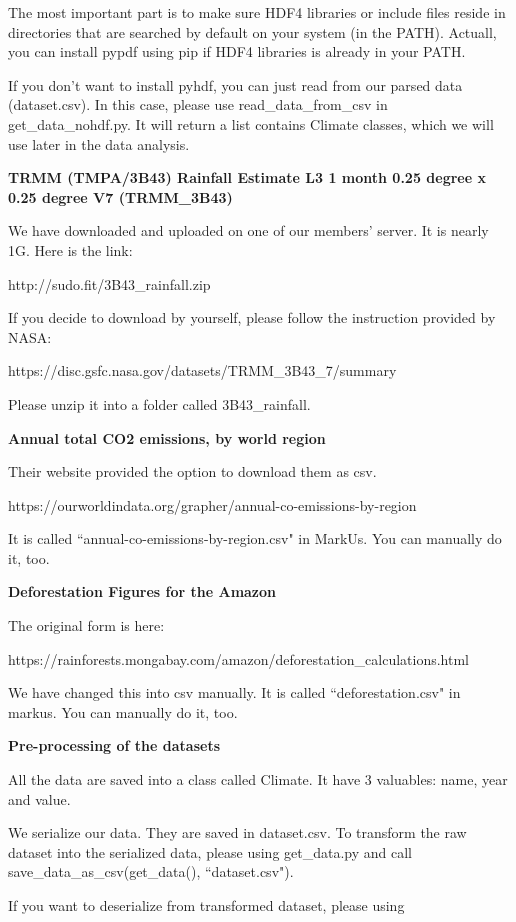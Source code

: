\documentclass[12pt]{article}
\begin{document}
\begin{enumerate}
\begin{text}
The most important part is to make sure HDF4 libraries or include files reside in directories that are  searched by default on your system (in the PATH). Actuall, you can install pypdf using pip if HDF4 libraries is already in your PATH.

If you don't want to install pyhdf, you can just read from our parsed data (dataset.csv). In this case, please use read\_data\_from\_csv in get\_data\_nohdf.py. It will return a list contains Climate classes, which we will use later in the data analysis.

\textbf{TRMM (TMPA/3B43) Rainfall Estimate L3 1 month 0.25 degree x 0.25 degree V7 (TRMM\_3B43)}

We have downloaded and uploaded on one of our members' server. It is nearly 1G. Here is the link:

http://sudo.fit/3B43\_rainfall.zip 

If you decide to download by yourself, please follow the instruction provided by NASA:

https://disc.gsfc.nasa.gov/datasets/TRMM\_3B43\_7/summary

Please unzip it into a folder called 3B43\_rainfall.

\textbf{Annual total CO2 emissions, by world region}

Their website provided the option to download them as csv.

https://ourworldindata.org/grapher/annual-co-emissions-by-region

It is called ``annual-co-emissions-by-region.csv" in MarkUs. 
You can manually do it, too.

\textbf{Deforestation Figures for the Amazon}

The original form is here: 

https://rainforests.mongabay.com/amazon/deforestation\_calculations.html

We have changed this into csv manually. It is called ``deforestation.csv" in markus. 
You can manually do it, too.

\textbf{Pre-processing of the datasets}

All the data are saved into a class called Climate. It have 3 valuables: name, year and value.

We serialize our data. They are saved in dataset.csv. To transform the raw dataset into the serialized data, please using get\_data.py and call save\_data\_as\_csv(get\_data(), ``dataset.csv").

If you want to deserialize from transformed dataset, please using 


\end{text}
\end{enumerate}
\end{document}
